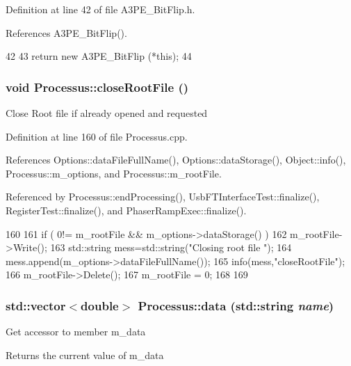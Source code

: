 Definition at line 42 of file A3PE\_\-BitFlip.h.

References A3PE\_\-BitFlip().


\begin{DoxyCode}
42                        {
43     return new A3PE_BitFlip (*this);
44   }
\end{DoxyCode}
\hypertarget{classProcessus_a2f3c41e99da4c738ea3d8f7b0d20a665}{
\subsubsection[{closeRootFile}]{\setlength{\rightskip}{0pt plus 5cm}void Processus::closeRootFile ()}}
\label{classProcessus_a2f3c41e99da4c738ea3d8f7b0d20a665}
Close Root file if already opened and requested 

Definition at line 160 of file Processus.cpp.

References Options::dataFileFullName(), Options::dataStorage(), Object::info(), Processus::m\_\-options, and Processus::m\_\-rootFile.

Referenced by Processus::endProcessing(), UsbFTInterfaceTest::finalize(), RegisterTest::finalize(), and PhaserRampExec::finalize().


\begin{DoxyCode}
160                                 {
161   if ( 0!= m_rootFile && m_options->dataStorage() ){
162     m_rootFile->Write();
163         std::string mess=std::string("Closing root file ");
164         mess.append(m_options->dataFileFullName());
165         info(mess,"closeRootFile");
166     m_rootFile->Delete();
167     m_rootFile = 0;
168   }
169 }
\end{DoxyCode}
\hypertarget{classProcessus_abf4d91fb36707e1d50178bab12d21ae9}{
\subsubsection[{data}]{\setlength{\rightskip}{0pt plus 5cm}std::vector$<$double$>$ Processus::data (std::string {\em name})}}
\label{classProcessus_abf4d91fb36707e1d50178bab12d21ae9}
Get accessor to member m\_\-data \begin{DoxyReturn}{Returns}
the current value of m\_\-data 
\end{DoxyReturn}


